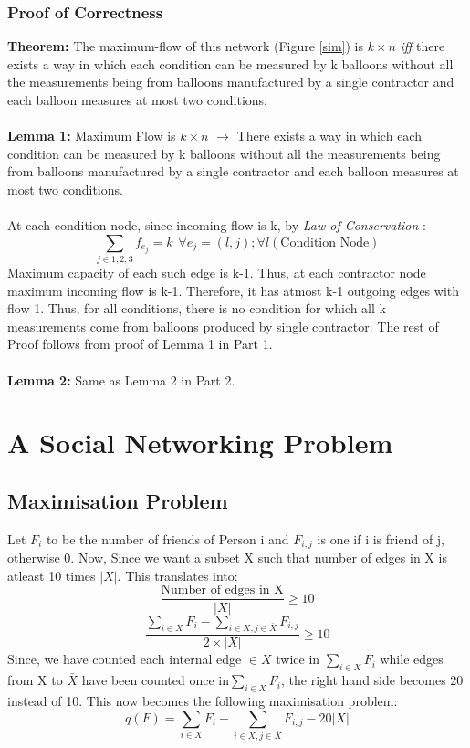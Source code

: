 \documentclass{article}
\begin{document}
\subsubsection{Proof of Correctness}
\textbf{Theorem: } The maximum-flow of this network (Figure \ref{sim}) is $k \times n$ \emph{iff} there exists a way in which each condition can be measured by k balloons without all the measurements being from balloons manufactured by a single contractor and each balloon measures at most two conditions.\\ \\
\textbf{Lemma 1:} Maximum Flow is $k \times n$ $ \rightarrow $ There exists a way in which each condition can be measured by k balloons without all the measurements being from balloons manufactured by a single contractor and each balloon measures at most two conditions.\\ \\
At each condition node, since incoming flow is k, by \emph{Law of Conservation} :
$$\sum_{j \in {1,2,3}}f_{e_j} = k \hspace{5pt} \forall e_j=(l,j); \forall l(\text{Condition Node})$$
Maximum capacity of each such edge is k-1. Thus, at each contractor node maximum incoming flow is k-1. Therefore, it has atmost k-1 outgoing edges with flow 1. Thus, for all conditions, there is no condition for which all k measurements come from balloons produced by single contractor. The rest of Proof follows from proof of Lemma 1 in Part 1. \\ \\
\textbf{Lemma 2:} Same as Lemma 2 in Part 2.

\section{A Social Networking Problem}
\subsection{Maximisation Problem}
Let $F_i$ to be the number of friends of Person i and $F_{i,j}$ is one if i is friend of j, otherwise 0. Now, Since we want a subset X such that number of edges in X is atleast 10 times $|X|$. This translates into:
$$ \frac{\text{Number of edges in X}}{|X|} \geq 10$$
$$ \frac{ \sum_{i \in X}F_i - \sum_{i \in X, j \in \bar{X}}F_{i,j}}{2 \times|X|} \geq 10$$
Since, we have counted each internal edge $\in X$ twice in $\sum_{i \in X}F_i$ while edges from X to $\bar{X}$ have been counted once in$\sum_{i \in X}F_i$, the right hand side becomes 20 instead of 10. This now becomes the following maximisation problem:
$$ q(F) = \sum_{i \in X}F_i -  \sum_{i \in X, j \in \bar{X}}F_{i,j} - 20|X| $$
\end{document}
